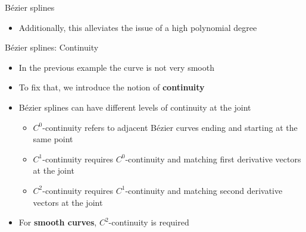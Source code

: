 \begin{frame}{B\'ezier splines}
\begin{itemize}
\begin{columns}
\begin{column}{5.5cm}
\begin{figure}[h!]
\begin{tikzpicture}[scale=0.5]
                \end{tikzpicture}
            \end{figure}
        \end{column}

    \end{columns}
        \vspace{1em}
        \item Additionally, this alleviates the issue of a high polynomial degree
    \end{itemize}
\end{frame}


\begin{frame}{B\'ezier splines: Continuity}
    \begin{itemize}
        \item In the previous example the curve is not very smooth\vspace{0.8em}
        \item To fix that, we introduce the notion of \textbf{continuity} \vspace{0.8em}
        \item B\'ezier splines can have different levels of continuity at the joint
        \vspace{0.8em}
        \begin{itemize}
            \item $C^0$-continuity refers to adjacent Bézier curves ending and starting at the same point
            \item $C^1$-continuity requires $C^0$-continuity and matching first derivative vectors at the joint
            \item $C^2$-continuity requires $C^1$-continuity and matching second derivative vectors at the joint
        \end{itemize}
        \vspace{0.8em}
        \item For \textbf{smooth curves}, $C^2$-continuity is required
    \end{itemize}
\end{frame}

